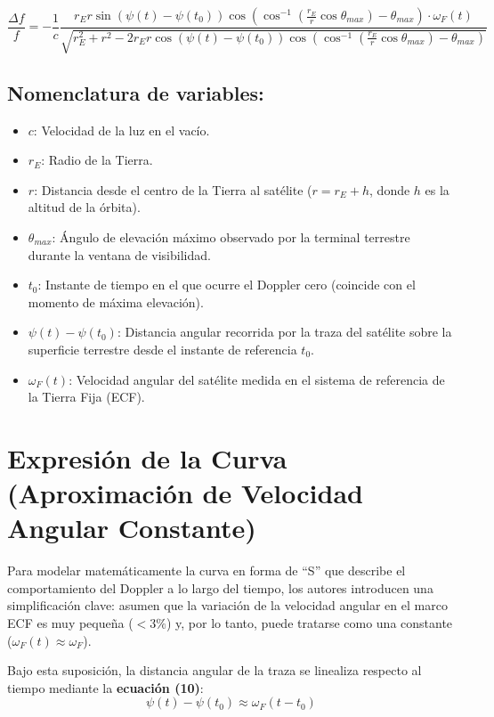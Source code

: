 \begin{equation}
\frac{\Delta f}{f} = -\frac{1}{c}\frac{r_{E}r \sin(\psi(t)-\psi(t_{0}))\cos\left(\cos^{-1}\left(\frac{r_{E}}{r}\cos \theta_{max}\right)-\theta_{max}\right)\cdot\omega_{F}(t)}{\sqrt{r_{E}^{2}+r^{2}-2r_{E}r \cos(\psi(t)-\psi(t_{0}))\cos\left(\cos^{-1}\left(\frac{r_{E}}{r}\cos \theta_{max}\right)-\theta_{max}\right)}}
\end{equation}

\subsection*{Nomenclatura de variables:}
\begin{itemize}
    \item $c$: Velocidad de la luz en el vacío.
    \item $r_{E}$: Radio de la Tierra.
    \item $r$: Distancia desde el centro de la Tierra al satélite ($r = r_{E} + h$, donde $h$ es la altitud de la órbita).
    \item $\theta_{max}$: Ángulo de elevación máximo observado por la terminal terrestre durante la ventana de visibilidad.
    \item $t_{0}$: Instante de tiempo en el que ocurre el Doppler cero (coincide con el momento de máxima elevación).
    \item $\psi(t)-\psi(t_{0})$: Distancia angular recorrida por la traza del satélite sobre la superficie terrestre desde el instante de referencia $t_{0}$.
    \item $\omega_{F}(t)$: Velocidad angular del satélite medida en el sistema de referencia de la Tierra Fija (ECF).
\end{itemize}

\section{Expresión de la Curva (Aproximación de Velocidad Angular Constante)}

Para modelar matemáticamente la curva en forma de ``S'' que describe el comportamiento del Doppler a lo largo del tiempo, los autores introducen una simplificación clave: asumen que la variación de la velocidad angular en el marco ECF es muy pequeña ($<3\%$) y, por lo tanto, puede tratarse como una constante ($\omega_{F}(t) \approx \omega_{F}$).

Bajo esta suposición, la distancia angular de la traza se linealiza respecto al tiempo mediante la \textbf{ecuación (10)}:
\begin{equation}
\psi(t) - \psi(t_{0}) \approx \omega_{F}(t - t_{0})
\end{equation}

